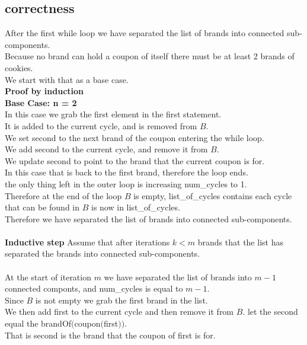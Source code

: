 \documentclass{article}
\begin{document}
    \subsection{correctness}
      After the first while loop we have separated the list of brands into connected sub-components.\\
      Because no brand can hold a coupon of itself there must be at least 2 brands of cookies.\\
      We start with that as a base case.\\
      \textbf{Proof by induction}\\
      \textbf{Base Case: n = 2}\\
      In this case we grab the first element in the first statement.\\
      It is added to the current cycle, and is removed from $B$.\\
      We set second to the next brand of the coupon entering the while loop.\\
      We add second to the current cycle, and remove it from $B$.\\
      We update second to point to the brand that the current coupon is for.\\
      In this case that is back to the first brand, therefore the loop ends.\\
      the only thing left in the outer loop is increasing num\_cycles to 1.\\
      Therefore at the end of the loop $B$ is empty, list\_of\_cycles contains each cycle that can be found in $B$ is now in list\_of\_cycles.\\
      Therefore we have separated the list of brands into connected sub-components.\\
      \\
      \textbf{Inductive step} Assume that after iterations $k < m$ brands that the list has separated the brands into connected sub-components.\\
      \\
      At the start of iteration $m$ we have separated the list of brands into $m - 1$ connected componts, and num\_cycles is equal to $m - 1$.\\
      Since $B$ is not empty we grab the first brand in the list.\\
      We then add first to the current cycle and then remove it from $B$.
      let the second equal the brandOf$($coupon$($first$))$.\\
      That is second is the brand that the coupon of first is for.\\
\end{document}
